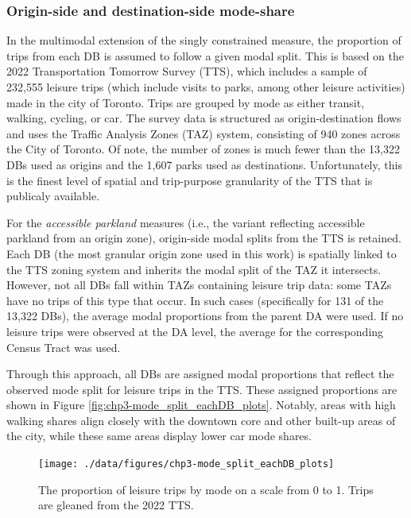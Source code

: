 \documentclass[
11pt, %
oneside, %
english, %
singlespacing, %
]{macthesis} %
\begin{document}
\subsubsection{Origin-side and destination-side mode-share}\label{origin-side-and-destination-side-mode-share}

In the multimodal extension of the singly constrained measure, the proportion of trips from each DB is assumed to follow a given modal split. This is based on the 2022 Transportation Tomorrow Survey (TTS), which includes a sample of 232,555 leisure trips (which include visits to parks, among other leisure activities) made in the city of Toronto. Trips are grouped by mode as either transit, walking, cycling, or car. The survey data is structured as origin-destination flows and uses the Traffic Analysis Zones (TAZ) system, consisting of 940 zones across the City of Toronto. Of note, the number of zones is much fewer than the 13,322 DBs used as origins and the 1,607 parks used as destinations. Unfortunately, this is the finest level of spatial and trip-purpose granularity of the TTS that is publicaly available.

For the \emph{accessible parkland} measures (i.e., the variant reflecting accessible parkland from an origin zone), origin-side modal splits from the TTS is retained. Each DB (the most granular origin zone used in this work) is spatially linked to the TTS zoning system and inherits the modal split of the TAZ it intersects. However, not all DBs fall within TAZs containing leisure trip data: some TAZs have no trips of this type that occur. In such cases (specifically for 131 of the 13,322 DBs), the average modal proportions from the parent DA were used. If no leisure trips were observed at the DA level, the average for the corresponding Census Tract was used.

Through this approach, all DBs are assigned modal proportions that reflect the observed mode split for leisure trips in the TTS. These assigned proportions are shown in Figure \ref{fig:chp3-mode_split_eachDB_plots}. Notably, areas with high walking shares align closely with the downtown core and other built-up areas of the city, while these same areas display lower car mode shares.

\begin{figure}

{\centering \texttt{[image: ./data/figures/chp3-mode\_split\_eachDB\_plots]} 

}

\caption{\label{fig:chp3-mode_split_eachDB_plots}  The proportion of leisure trips by mode on a scale from 0 to 1. Trips are gleaned from the 2022 TTS. }\label{fig:unnamed-chunk-51}
\end{figure}
\end{document}
